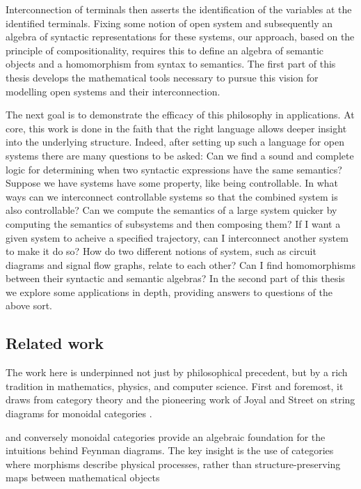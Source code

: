 Interconnection of terminals then asserts the identification of the variables at
the identified terminals. Fixing some notion of open system and subsequently an
algebra of syntactic representations for these systems, our approach, based on
the principle of compositionality, requires this to define an algebra of
semantic objects and a homomorphism from syntax to semantics. The first part of
this thesis develops the mathematical tools necessary to pursue this vision for
modelling open systems and their interconnection. 

The next goal is to demonstrate the efficacy of this philosophy in applications.
At core, this work is done in the faith that the right language allows deeper
insight into the underlying structure. Indeed, after setting up such a language
for open systems there are many questions to be asked: Can we find a sound and
complete logic for determining when two syntactic expressions have the same
semantics? Suppose we have systems have some property, like being controllable.
In what ways can we interconnect controllable systems so that the combined
system is also controllable? Can we compute the semantics of a large system
quicker by computing the semantics of subsystems and then composing them?  If I
want a given system to acheive a specified trajectory, can I interconnect
another system to make it do so? How do two different notions of system, such as
circuit diagrams and signal flow graphs, relate to each other? Can I find
homomorphisms between their syntactic and semantic algebras? In the second part
of this thesis we explore some applications in depth, providing answers to
questions of the above sort.

\subsection*{Related work}

The work here is underpinned not just by philosophical precedent, but by a rich
tradition in mathematics, physics, and computer science. First and foremost, it
draws from category theory and the pioneering work of Joyal and
Street on string diagrams for monoidal categories \cite{JS91,JS93}.

and conversely monoidal categories
provide an algebraic foundation for the intuitions behind Feynman diagrams.  The
key insight is the use of categories where morphisms describe physical
processes, rather than structure-preserving maps between mathematical objects
\cite{BaezStay,CP}
 
